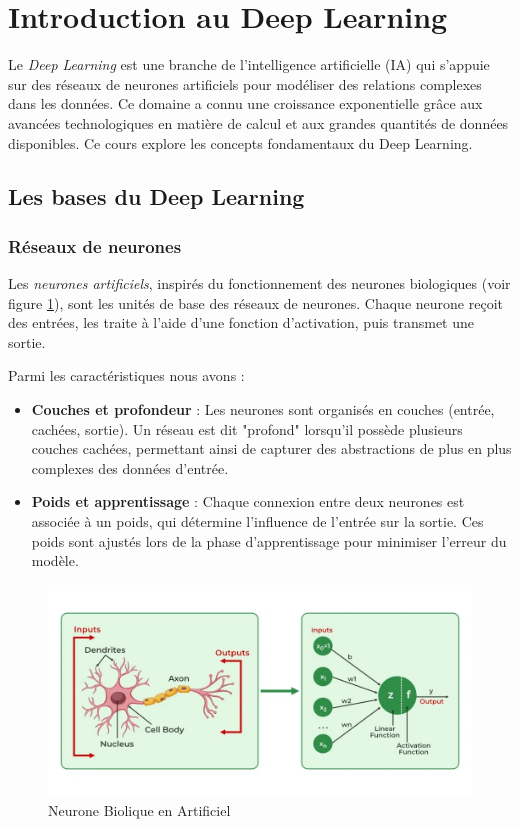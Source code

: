 \section{Introduction au Deep Learning}

Le \textit{Deep Learning} est une branche de l'intelligence artificielle (IA) qui s'appuie sur des réseaux de neurones artificiels pour modéliser des relations complexes dans les données. Ce domaine a connu une croissance exponentielle grâce aux avancées technologiques en matière de calcul et aux grandes quantités de données disponibles. Ce cours explore les concepts fondamentaux du Deep Learning.

\subsection{Les bases du Deep Learning}

\subsubsection{Réseaux de neurones}
	 Les \textit{neurones artificiels}, inspirés du fonctionnement des neurones biologiques (voir figure \ref{fig:ann}), sont les unités de base des réseaux de neurones. Chaque neurone reçoit des entrées, les traite à l'aide d'une fonction d'activation, puis transmet une sortie.
	 
	 Parmi les caractéristiques nous avons : 
	\begin{itemize}
		\item \textbf{Couches et profondeur} : Les neurones sont organisés en couches (entrée, cachées, sortie). Un réseau est dit "profond" lorsqu'il possède plusieurs couches cachées, permettant ainsi de capturer des abstractions de plus en plus complexes des données d'entrée.
		\item \textbf{Poids et apprentissage} : Chaque connexion entre deux neurones est associée à un poids, qui détermine l'influence de l'entrée sur la sortie. Ces poids sont ajustés lors de la phase d'apprentissage pour minimiser l'erreur du modèle.
	\end{itemize}
	\begin{figure}[h!]
		\centering
		\includegraphics[width=0.9\linewidth]{images/Artificial-Neural-Networks}
		\caption{Neurone Biolique en Artificiel~\cite{geeksforgeeks}}
		\label{fig:ann}
	\end{figure}
	
